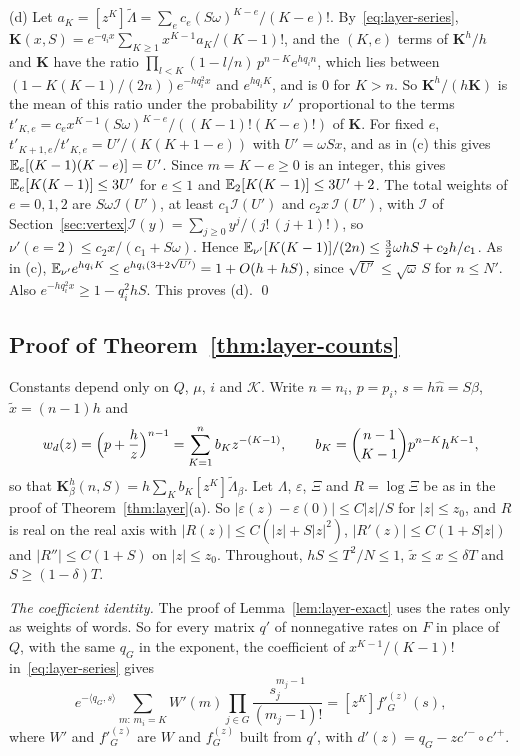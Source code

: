(d) Let $a_K=[z^K]\widetilde\Lambda=\sum_ec_e(S\omega)^{K-e}/(K-e)!$. By~\eqref{eq:layer-series},
$\mathbf K(x,S)=e^{-q_ix}\sum_{K\ge1}x^{K-1}a_K/(K-1)!$, and the $(K,e)$ terms of $\mathbf K^h/h$ and
$\mathbf K$ have the ratio $\prod_{l<K}(1-l/n)\,p^{n-K}e^{hq_in}$, which lies between
$(1-K(K-1)/(2n))e^{-hq_i^2x}$ and $e^{hq_iK}$, and is $0$ for $K>n$. So
$\mathbf K^h/(h\mathbf K)$ is the mean of this ratio under the probability $\nu'$ proportional to
the terms $t'_{K,e}=c_ex^{K-1}(S\omega)^{K-e}/((K-1)!(K-e)!)$ of $\mathbf K$. For fixed $e$,
$t'_{K+1,e}/t'_{K,e}=U'/(K(K+1-e))$ with $U'=\omega Sx$, and as in (c) this gives
$\mathbb{E}_e[(K-1)(K-e)]=U'$. Since $m=K-e\ge0$ is an integer, this gives $\mathbb{E}_e[K(K-1)]\le3U'$ for $e\le1$ and
$\mathbb{E}_2[K(K-1)]\le3U'+2$. The total weights of $e=0,1,2$ are $S\omega\mathcal I(U')$, at least $c_1\mathcal I(U')$
and $c_2x\,\mathcal I(U')$, with
\ifarxivbuild $\mathcal I$ of Section~\ref{sec:vertex}\else $\mathcal I(y)=\sum_{j\ge0}y^j/(j!\,(j+1)!)$\fi, so $\nu'(e=2)\le c_2x/(c_1+S\omega)$.
Hence $\mathbb{E}_{\nu'}[K(K-1)]/(2n)\le\frac32\omega hS+c_2h/c_1$. As in (c),
$\mathbb{E}_{\nu'}e^{hq_iK}\le e^{hq_i(3+2\sqrt{U'})}=1+O(h+hS)$, since $\sqrt{U'}\le\sqrt\omega\,S$ for
$n\le N'$. Also $e^{-hq_i^2x}\ge1-q_i^2hS$. This proves (d). \qed

\subsection{Proof of Theorem~\ref{thm:layer-counts}}

Constants depend only on $Q$, $\mu$, $i$ and $\mathcal K$. Write $n=n_i$, $p=p_i$, $s=h\hat n=S\beta$,
$\tilde x=(n-1)h$ and
\[
w_d(z)=\Bigl(p+\frac hz\Bigr)^{n-1}=\sum_{K=1}^nb_Kz^{-(K-1)},\qquad b_K=\binom{n-1}{K-1}p^{n-K}h^{K-1},
\]
so that $\mathbf K^h_\beta(n,S)=h\sum_Kb_K[z^K]\widetilde\Lambda_\beta$. Let $\Lambda$,
$\varepsilon$, $\Xi$ and $R=\log\Xi$ be as in the proof of Theorem~\ref{thm:layer}(a). So
$|\varepsilon(z)-\varepsilon(0)|\le C|z|/S$ for $|z|\le z_0$, and $R$ is real on the real axis with
$|R(z)|\le C(|z|+S|z|^2)$, $|R'(z)|\le C(1+S|z|)$ and $|R''|\le C(1+S)$ on $|z|\le z_0$. Throughout,
$hS\le T^2/N\le1$, $\tilde x\le x\le\delta T$ and $S\ge(1-\delta)T$.

\emph{The coefficient identity.} The proof of Lemma~\ref{lem:layer-exact} uses the rates only as
weights of words. So for every matrix $q'$ of nonnegative rates on $F$ in place of $Q$, with the
same $q_G$ in the exponent, the coefficient of $x^{K-1}/(K-1)!$ in~\eqref{eq:layer-series} gives
\[
e^{-\langle q_G,s\rangle}\sum_{m:\,m_i=K}W'(m)\prod_{j\in G}\frac{s_j^{m_j-1}}{(m_j-1)!}=[z^K]f'^{(z)}_G(s),
\]
where $W'$ and $f'^{(z)}_G$ are $W$ and $f^{(z)}_G$ built from $q'$, with
$d'(z)=q_G-zc'^-\circ c'^+$.


